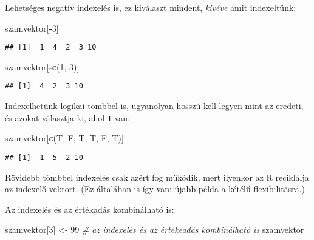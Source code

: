 \documentclass[]{book}
\newenvironment{Shaded}{\begin{snugshade}}{\end{snugshade}}
\newcommand{\KeywordTok}[1]{\textcolor[rgb]{0.13,0.29,0.53}{\textbf{#1}}}
\newcommand{\DecValTok}[1]{\textcolor[rgb]{0.00,0.00,0.81}{#1}}
\newcommand{\StringTok}[1]{\textcolor[rgb]{0.31,0.60,0.02}{#1}}
\newcommand{\CommentTok}[1]{\textcolor[rgb]{0.56,0.35,0.01}{\textit{#1}}}
\newcommand{\OperatorTok}[1]{\textcolor[rgb]{0.81,0.36,0.00}{\textbf{#1}}}
\newcommand{\NormalTok}[1]{#1}
\begin{document}
Lehetséges negatív indexelés is, ez kiválaszt mindent, \emph{kivéve}
amit indexeltünk:

\begin{Shaded}
\begin{Highlighting}[]
\NormalTok{szamvektor[}\OperatorTok{-}\DecValTok{3}\NormalTok{]}
\end{Highlighting}
\end{Shaded}

\begin{verbatim}
## [1]  1  4  2  3 10
\end{verbatim}

\begin{Shaded}
\begin{Highlighting}[]
\NormalTok{szamvektor[}\OperatorTok{-}\KeywordTok{c}\NormalTok{(}\DecValTok{1}\NormalTok{, }\DecValTok{3}\NormalTok{)]}
\end{Highlighting}
\end{Shaded}

\begin{verbatim}
## [1]  4  2  3 10
\end{verbatim}

Indexelhetünk logikai tömbbel is, ugyanolyan hosszú kell legyen mint az
eredeti, és azokat választja ki, ahol \texttt{T} van:

\begin{Shaded}
\begin{Highlighting}[]
\NormalTok{szamvektor[}\KeywordTok{c}\NormalTok{(T, F, T, T, F, T)]}
\end{Highlighting}
\end{Shaded}

\begin{verbatim}
## [1]  1  5  2 10
\end{verbatim}

Rövidebb tömbbel indexelés csak azért fog működik, mert ilyenkor az R
reciklálja az indexelő vektort. (Ez általában is így van: újabb példa a
kétélű flexibilitásra.)

Az indexelés és az értékadás kombinálható is:

\begin{Shaded}
\begin{Highlighting}[]
\NormalTok{szamvektor[}\DecValTok{3}\NormalTok{] <-}\StringTok{ }\DecValTok{99}  \CommentTok{# az indexelés és az értékeadás kombinálható is}
\NormalTok{szamvektor}
\end{Highlighting}
\end{Shaded}
\end{document}
